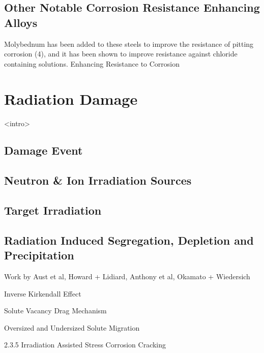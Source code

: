 \subsection{Other Notable Corrosion Resistance Enhancing Alloys}

Molybednum has been added to these steels to improve the resistance of pitting corrosion (4), and it has been shown to improve resistance against chloride containing solutions. Enhancing Resistance to Corrosion

\section{Radiation Damage}

<intro>

\subsection{Damage Event}

\subsection{Neutron \& Ion Irradiation Sources}

\subsection{Target Irradiation}

\subsection{Radiation Induced Segregation, Depletion and Precipitation}

Work by Aust et al, Howard + Lidiard, Anthony et al, Okamato + Wiedersich






Inverse Kirkendall Effect

Solute Vacancy Drag Mechanism

Oversized and Undersized Solute Migration



2.3.5	Irradiation Assisted Stress Corrosion Cracking
 









